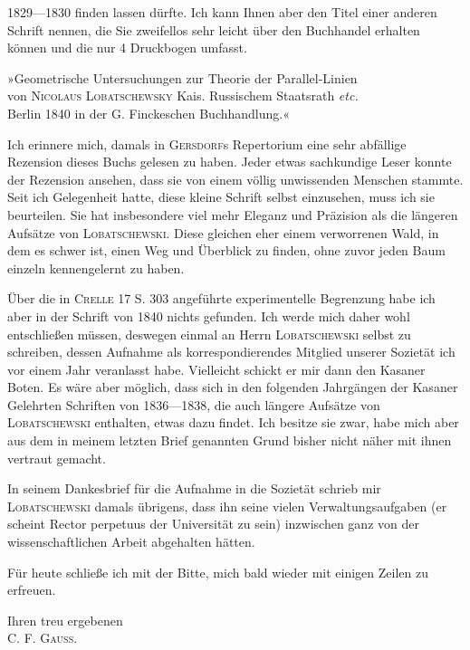 %
1829---1830 finden lassen dürfte. Ich kann Ihnen aber den Titel einer anderen Schrift nennen, die Sie zweifellos sehr leicht über den Buchhandel erhalten können und die nur 4 Druckbogen umfasst.

\begin{center}
»Geometrische Untersuchungen zur Theorie der Parallel-Linien\\
von \textsc{Nicolaus} \textsc{Lobatschewsky} Kais. Russischem Staatsrath \emph{etc.}\\
Berlin 1840 in der G. Finckeschen Buchhandlung.«
\end{center}

Ich erinnere mich, damals in \textsc{Gersdorf}s Repertorium eine sehr abfällige Rezension dieses Buchs gelesen zu haben. Jeder etwas sachkundige Leser konnte der Rezension ansehen, dass sie von einem völlig unwissenden Menschen stammte. Seit ich Gelegenheit hatte, diese kleine Schrift selbst einzusehen, muss ich sie  beurteilen. Sie hat insbesondere viel mehr Eleganz und Präzision als die längeren Aufsätze von \textsc{Lobatschewski}. Diese gleichen eher einem verworrenen Wald, in dem es schwer ist, einen Weg und Überblick zu finden, ohne zuvor jeden Baum einzeln kennengelernt zu haben.

Über die in \textsc{Crelle} 17 S. 303 angeführte experimentelle Begrenzung habe ich aber in der Schrift von 1840 nichts gefunden. Ich werde mich daher wohl entschließen müssen, deswegen einmal an Herrn \textsc{Lobatschewski} selbst zu schreiben, dessen Aufnahme als korrespondierendes Mitglied unserer Sozietät ich vor einem Jahr veranlasst habe. Vielleicht schickt er mir dann den Kasaner Boten. Es wäre aber möglich, dass sich in den folgenden Jahrgängen der Kasaner Gelehrten Schriften von 1836---1838, die auch längere Aufsätze von \textsc{Lobatschewski} enthalten, etwas dazu findet. Ich besitze sie zwar, habe mich aber aus dem in meinem letzten Brief genannten Grund bisher nicht näher mit ihnen vertraut gemacht.

In seinem Dankesbrief für die Aufnahme in die Sozietät schrieb mir \textsc{Lobatschewski} damals übrigens, dass ihn seine vielen Verwaltungsaufgaben (er scheint Rector perpetuus der Universität zu sein) inzwischen ganz von der wissenschaftlichen Arbeit abgehalten hätten.

Für heute schließe ich mit der Bitte, mich bald wieder mit einigen Zeilen zu erfreuen.

\begin{flushright}
Ihren treu ergebenen\\
\textsc{C. F. Gauss}.
\end{flushright}

\par\bigskip
